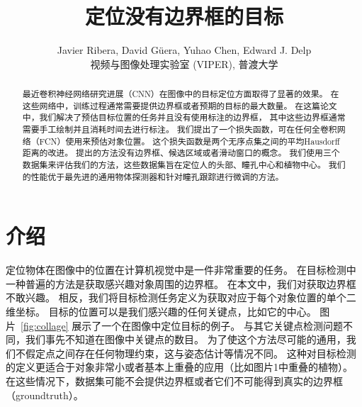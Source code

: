 \documentclass[10pt,twocolumn,letterpaper,UTF8]{article}
\begin{document}


\title{定位没有边界框的目标}

\author{Javier Ribera, David G\"{u}era, Yuhao Chen, Edward J. Delp\\
    {视频与图像处理实验室 (VIPER), 普渡大学} \\
}

\maketitle
\ifcvprfinal\thispagestyle{empty}\fi


\begin{abstract}
    最近卷积神经网络研究进展（CNN）在图像中的目标定位方面取得了显著的效果。
    在这些网络中，训练过程通常需要提供边界框或者预期的目标的最大数量。
    在这篇论文中，我们解决了预估目标位置的任务并且没有使用标注的边界框，
    其中这些边界框通常需要手工绘制并且消耗时间去进行标注。
    我们提出了一个损失函数，可在任何全卷积网络（FCN）使用来预估对象位置。
    这个损失函数是两个无序点集之间的平均Hausdorff距离的改进。
    提出的方法没有边界框、候选区域或者滑动窗口的概念。
    我们使用三个数据集来评估我们的方法，这些数据集旨在定位人的头部、瞳孔中心和植物中心。
    我们的性能优于最先进的通用物体探测器和针对瞳孔跟踪进行微调的方法。
\end{abstract}

\section{介绍}

定位物体在图像中的位置在计算机视觉中是一件非常重要的任务。
在目标检测中一种普遍的方法是获取感兴趣对象周围的边界框。
在本文中，我们对获取边界框不敢兴趣。
相反，我们将目标检测任务定义为获取对应于每个对象位置的单个二维坐标。
目标的位置可以是我们感兴趣的任何关键点，比如它的中心。
图片~\ref{fig:collage} 展示了一个在图像中定位目标的例子。
与其它关键点检测问题不同，我们事先不知道在图像中关键点的数目。
为了使这个方法尽可能的通用，我们不假定点之间存在任何物理约束，这与姿态估计等情况不同。
这种对目标检测的定义更适合于对象非常小或者基本上重叠的应用（比如图片1中重叠的植物）。
在这些情况下，数据集可能不会提供边界框或者它们不可能得到真实的边界框（groundtruth）。
\end{document}
